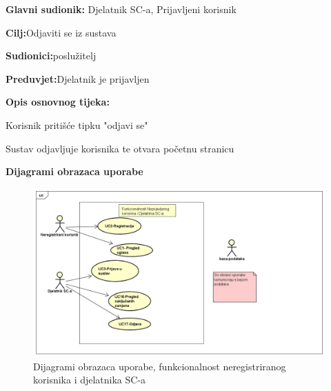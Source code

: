 \noindent {}
\begin{packed_item}
	
	\item \textbf{Glavni sudionik: }Djelatnik SC-a, Prijavljeni korisnik
	\item  \textbf{Cilj:}Odjaviti se iz sustava
	\item  \textbf{Sudionici:}poslužitelj
	\item  \textbf{Preduvjet:}Djelatnik je prijavljen
	\item  \textbf{Opis osnovnog tijeka:}
	
	\item[] \begin{packed_enum}
		
		\item Korisnik pritišće tipku "odjavi se"
		\item Sustav odjavljuje korisnika te otvara početnu stranicu		
		
	\end{packed_enum}
	
\end{packed_item}	

\noindent \textbf{Dijagrami obrazaca uporabe}
\begin{figure}[H]
	\includegraphics[scale=0.4]{dijagrami/dijagram1.PNG} %
	\centering
	\caption{Dijagrami obrazaca uporabe, funkcionalnost neregistriranog korisnika i djelatnika SC-a}
	\label{fig:dijagramObrazaca1}
\end{figure}

